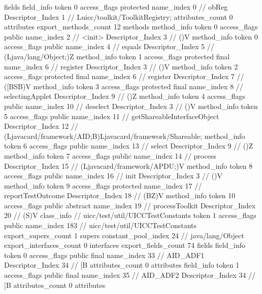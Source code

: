 {{{			fields {
			field_info {
				token	0
				access_flags	protected
				name_index	0		// obReg
				Descriptor_Index	1		// Luicc/toolkit/ToolkitRegistry;
				attributes_count	0
				attributes {
				}
			}
			}
			export_methods_count	12
			methods {
				method_info {
					token	0
					access_flags	public
					name_index	2		// <init>
					Descriptor_Index	3		// ()V
				}
				method_info {
					token	0
					access_flags	public
					name_index	4		// equals
					Descriptor_Index	5		// (Ljava/lang/Object;)Z
				}
				method_info {
					token	1
					access_flags	protected final
					name_index	6		// register
					Descriptor_Index	3		// ()V
				}
				method_info {
					token	2
					access_flags	protected final
					name_index	6		// register
					Descriptor_Index	7		// ([BSB)V
				}
				method_info {
					token	3
					access_flags	protected final
					name_index	8		// selectingApplet
					Descriptor_Index	9		// ()Z
				}
				method_info {
					token	4
					access_flags	public
					name_index	10		// deselect
					Descriptor_Index	3		// ()V
				}
				method_info {
					token	5
					access_flags	public
					name_index	11		// getShareableInterfaceObject
					Descriptor_Index	12		// (Ljavacard/framework/AID;B)Ljavacard/framework/Shareable;
				}
				method_info {
					token	6
					access_flags	public
					name_index	13		// select
					Descriptor_Index	9		// ()Z
				}
				method_info {
					token	7
					access_flags	public
					name_index	14		// process
					Descriptor_Index	15		// (Ljavacard/framework/APDU;)V
				}
				method_info {
					token	8
					access_flags	public
					name_index	16		// init
					Descriptor_Index	3		// ()V
				}
				method_info {
					token	9
					access_flags	protected
					name_index	17		// reportTestOutcome
					Descriptor_Index	18		// (BZ)V
				}
				method_info {
					token	10
					access_flags	public abstract
					name_index	19		// processToolkit
					Descriptor_Index	20		// (S)V
				}
			}
		}
		class_info {		// uicc/test/util/UICCTestConstants
			token	1
			access_flags	public
			name_index	183		// uicc/test/util/UICCTestConstants
			export_supers_count	1
			supers {
				constant_pool_index	24		// java/lang/Object
			}
			export_interfaces_count	0
			interfaces {
			}
			export_fields_count	74
			fields {
			field_info {
				token	0
				access_flags	public final
				name_index	33		// AID_ADF1
				Descriptor_Index	34		// [B
				attributes_count	0
				attributes {
				}
			}
			field_info {
				token	1
				access_flags	public final
				name_index	35		// AID_ADF2
				Descriptor_Index	34		// [B
				attributes_count	0
				attributes {
				}
			}
}}}}
